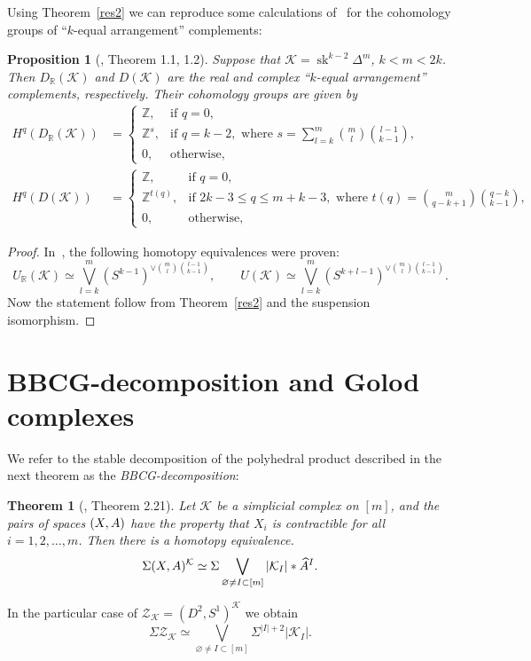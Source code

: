\documentclass[a4paper,12pt]{amsart}
\newcommand{\K}{\mathcal K}
\newcommand{\RR}{\mathbb R}
\newcommand{\ZZ}{\mathbb Z}
\renewcommand{\le}{\leqslant}
\newcommand{\Z}{\mathcal Z}
\newtheorem{theorem}[formula]{Theorem}
\newtheorem{proposition}[formula]{Proposition}
\theoremstyle{definition}
\theoremstyle{remark}
\numberwithin{equation}{section}
\DeclareMathOperator{\sk}{sk}
\begin{document}
Using Theorem~\ref{res2} we can reproduce some calculations of~\cite{BjW} for the cohomology groups of ``$k$-equal arrangement'' complements:
\begin{proposition}[\cite{BjW}, Theorem 1.1, 1.2]
	Suppose that $\K = \sk^{k-2} \Delta^m$, $k < m < 2k$. Then $D_\RR(\K)$ and $D(\K)$ are the real and complex ``$k$-equal arrangement'' complements, respectively.
 Their cohomology groups are given by
 \begin{align*}
		H^q(D_\RR(\K))& = 
		\begin{cases}
			\ZZ, &\text{if } q = 0,\\
			\ZZ^s, &\text{if } q = k-2, \text { where } s = \sum_{l = k}^{m} {{m} \choose l} {{l-1} \choose {k - 1}},\\
			0, &\text{otherwise},
		\end{cases}\\
H^q(D(\K)) &= 
		\begin{cases}
			\ZZ, &\text{if } q = 0,\\
			\ZZ^{t(q)}, &\text{if } 2k - 3 \le q \le m + k - 3, \text{ where }
   t(q) = {m \choose q-k+1} {q-k \choose k-1},\\
			0, &\text{otherwise},
		\end{cases}
\end{align*}
\end{proposition}
\begin{proof}
In~\cite{GT}, the following homotopy equivalences were proven:
	$$U_\RR(\K) \simeq \bigvee_{l = k}^m (S^{k-1})^{\vee {m \choose l} {l-1 \choose k-1}},\qquad 
 U(\K) \simeq \bigvee_{l = k}^m (S^{k + l - 1})^{\vee {m \choose l} {l-1 \choose k-1}}.$$
Now the statement follow from Theorem~\ref{res2} and the suspension isomorphism.
\end{proof}



\section{BBCG-decomposition and Golod complexes}
We refer to the stable decomposition of the polyhedral product described in the next theorem as the \emph{BBCG-decomposition}:
\begin{theorem}[\cite{BBCG}, Theorem 2.21]
	Let $\K$ be a simplicial complex on $[m]$, and the pairs of spaces $(\textbf X, \textbf A)$ have the property 
	that $X_i$ is contractible for all $i = 1, 2, \dots, m$.
	Then there is a homotopy equivalence.
	$$\Sigma (\textbf X, \textbf A)^\K \simeq \Sigma \bigvee_{\varnothing \neq I \subset [m]} |\K_I| * \widehat A^I.$$
\end{theorem}
In the particular case of $\Z_\K=(D^2,S^1)^\K$ we obtain
$$\Sigma \Z_\K \simeq \bigvee_{\varnothing \neq I \subset [m]} \Sigma^{|I| + 2}|\K_I|.$$
\end{document}
